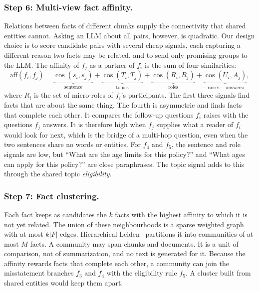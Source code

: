 \documentclass[sigconf, review, anonymous]{acmart}
\newcommand{\simcos}{\operatorname{cos}}
\begin{document}
\subsubsection*{Step 6: Multi-view fact affinity.}
Relations between facts of different chunks supply the connectivity that shared entities cannot. Asking an LLM about all pairs, however, is quadratic. Our design choice is to score candidate pairs with several cheap signals, each capturing a different reason two facts may be related, and to send only promising groups to the LLM. The affinity of $f_j$ as a partner of $f_i$ is the sum of four similarities:
\[
  \mathrm{aff}(f_i, f_j) =
  \underbrace{\simcos(s_i, s_j)}_{\text{sentence}} +
  \underbrace{\simcos(T_i, T_j)}_{\text{topics}} +
  \underbrace{\simcos(R_i, R_j)}_{\text{roles}} +
  \underbrace{\simcos(U_i, A_j)}_{\text{raises}\,\to\,\text{answers}},
\]
where $R_i$ is the set of micro-roles of $f_i$'s participants. The first three signals find facts that are about the same thing. The fourth is asymmetric and finds facts that complete each other. It compares the follow-up questions $f_i$ raises with the questions $f_j$ answers. It is therefore high when $f_j$ supplies what a reader of $f_i$ would look for next, which is the bridge of a multi-hop question, even when the two sentences share no words or entities. For $f_4$ and $f_5$, the sentence and role signals are low, but ``What are the age limits for this policy?'' and ``What ages can apply for this policy?'' are close paraphrases. The topic signal adds to this through the shared topic \emph{eligibility}.

\subsubsection*{Step 7: Fact clustering.}
Each fact keeps as candidates the $k$ facts with the highest affinity to which it is not yet related. The union of these neighbourhoods is a sparse weighted graph with at most $k|F|$ edges. Hierarchical Leiden~\cite{traag2019leiden} partitions it into communities of at most $M$ facts. A community may span chunks and documents. It is a unit of comparison, not of summarization, and no text is generated for it. Because the affinity rewards facts that complete each other, a community can join the misstatement branches $f_3$ and $f_4$ with the eligibility rule $f_5$. A cluster built from shared entities would keep them apart.
\end{document}
